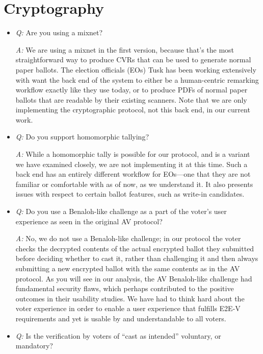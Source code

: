 \documentclass[12pt,letter]{article}
\begin{document}
\section{Cryptography}

\begin{itemize}

    \item \emph{Q:} Are you using a mixnet?

    \emph{A:} We are using a mixnet in the first version, because that's the most straightforward way to produce CVRs that can be used to generate normal paper ballots. The election officials (EOs) Tusk has been working extensively with want the back end of the system to either be a human-centric remarking workflow exactly like they use today, or to produce PDFs of normal paper ballots that are readable by their existing scanners.  Note that we are only implementing the cryptographic protocol, not this back end, in our current work.

    \item \emph{Q:} Do you support homomorphic tallying?

    \emph{A:} While a homomorphic tally is possible for our protocol, and is a variant we have examined closely, we are not implementing it at this time.  Such a back end has an entirely different workflow for EOs---one that they are not familiar or comfortable with as of now, as we understand it. It also presents issues with respect to certain ballot features, such as write-in candidates.

    \item \emph{Q:} Do you use a Benaloh-like challenge as a part of the voter's user experience as seen in the original AV protocol?

    \emph{A:} No, we do not use a Benaloh-like challenge; in our protocol the voter checks the decrypted contents of the actual encrypted ballot they submitted before deciding whether to cast it, rather than challenging it and then always submitting a new encrypted ballot with the same contents as in the AV protocol. As you will see in our analysis, the AV Benaloh-like challenge had fundamental security flaws, which perhaps contributed to the positive outcomes in their usability studies. We have had to think hard about the voter experience in order to enable a user experience that fulfills E2E-V requirements and yet is usable by and understandable to all voters.

    \item \emph{Q:} Is the verification by voters of ``cast as intended'' voluntary, or mandatory?


\end{itemize}
\end{document}

